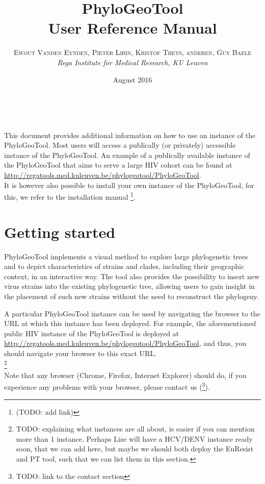 \documentclass[a4paper, 11pt]{article} %
\title{\textbf{PhyloGeoTool}\\ %
User Reference Manual} %
\author{\textsc{Ewout Vanden Eynden, Pieter Libin, Kristof Theys, anderen, Guy Baele} %
\\{\textit{Rega Institute for Medical Research, KU Leuven}}} %
\date{August 2016} %
\makeatletter
\renewcommand{\maketitle}{ %
\begin{flushright} %
{\LARGE\@title} %

\vspace{50pt} %

{\large\@author} %
\\\@date %

\vspace{40pt} %
\end{flushright}
}
\makeatother
\begin{document}
\maketitle %

\vspace{30pt} %

\tableofcontents
\newpage

This document provides additional information on how to use an instance of the PhyloGeoTool. Most users will access a publically (or privately) accessible instance of the PhyloGeoTool. An example of a publically available instance of the PhyloGeoTool that aims to serve a large HIV cohort can be found at \url{http://regatools.med.kuleuven.be/phylogeotool/PhyloGeoTool}.\\
It is however also possible to install your own instance of the PhyloGeoTool, for this, we refer to the installation manual \footnote{(TODO: add link)}.

\section{Getting started}

PhyloGeoTool implements a visual method to explore large phylogenetic trees and to depict characteristics of strains and clades, including their geographic context, in an interactive way.
The tool also provides the possibility to insert new virus strains into the existing phylogenetic tree, allowing users to gain insight in the placement of such new strains without the need to reconstruct the phylogeny.

A particular PhyloGeoTool instance can be used by navigating the browser to the URL at which this instance has been deployed. For example, the aforementioned public HIV instance of the PhyloGeoTool is deployed at \url{http://regatools.med.kuleuven.be/phylogeotool/PhyloGeoTool}, and thus, you should navigate your browser to this exact URL.\\
\footnote{
TODO: explaining what instances are all about, is easier if you can mention more than 1 instance. Perhaps Lize will have a HCV/DENV instance ready soon, that we can add here, but maybe we should both deploy the EuResist and PT tool, such that we can list them in this section.}\\
Note that any browser (Chrome, Firefox, Internet Explorer) should do, if you experience any problems with your browser, please contact us (\footnote{TODO: link to the contact section}).
\end{document}
